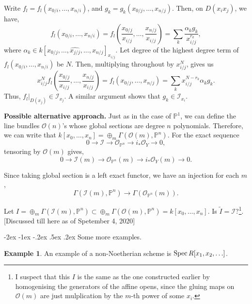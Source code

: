\documentclass[11pt]{amsart}
\makeatletter
\renewcommand\subsection{\@startsection {subsection}{1}{\z@}%
	{-2ex \@plus -1ex \@minus -.2ex}%
	{.5ex \@plus.2ex}%
	{\normalfont\bfseries}}
\newcommand{\Spec}{{\rm Spec \,}}
\renewcommand{\tilde}{\widetilde}
\newcommand{\sI}{{\mathcal I}}
\newcommand{\sO}{{\mathcal O}}
\renewcommand{\P}{{\mathbb P}}
\theoremstyle{definition}
\newtheorem{example}[theorem]{Example}
\makeatother
\begin{document}
Write $f_l=f_l(x_{0/i},\ldots,x_{n/i})$, and $g_k=g_k(x_{0/j},\ldots,x_{n/j})$. Then, on $D(x_i x_j)$, we have,
\[ f_l(x_{0/i},\ldots,x_{n/i})= f_l(\frac{x_{0/j}}{x_{i/j}}, \ldots,\frac{x_{n/j}}{x_{i/j}})=\sum_k \frac{\alpha_k g_k}{x_{i/j}^{r_k}}, \]
where $\alpha_k\in k[x_{0/j},\ldots,\widehat{x_{j/j}},\ldots,x_{n/j}]_{x_{i/j}}$. Let degree of the highest degree term of $f_l(x_{0/i},\ldots,x_{n/i})$ be $N$. Then, multiplying throughout by $x_{i/j}^N$, gives us
\[x_{i/j}^N f_l(\frac{x_{0/j}}{x_{i/j}},\ldots,\frac{x_{n/j}}{x_{i/j}})= f_l(x_{0/j},\ldots,x_{n/j})=\sum_k  x_{i/j}^{N-r_k} \alpha_k g_k.\]
Thus, $f_l|_{D(x_j)}\in \sI_{x_j}$. A similar argument shows that $g_k\in \sI_{x_i}$.

\noindent\textbf{Possible alternative approach.} Just as in the case of $\P^1$, we can define the line bundles $\sO(n)$'s whose global sections are degree $n$ polynomials. Therefore, we can write that $k[x_0,\ldots,x_n]=\oplus_m\Gamma (\sO(m),\P^n)$. For the exact sequence
\[0\rightarrow \sI\rightarrow \sO_{\P^n}\rightarrow i_*\sO_Y\rightarrow 0,\]
tensoring by $\sO(m)$ gives,
\[0\rightarrow \sI(m)\rightarrow \sO_{\P^n}(m)\rightarrow i_*\sO_Y(m)\rightarrow 0.\]

Since taking global section is a left exact functor, we have an injection for each $m$,
\[\Gamma (\sI(m),\P^n)\rightarrow \Gamma (\sO_{\P^n}(m)).\]

Let $I=\oplus_m \Gamma (\sI(m),\P^n)\subset \oplus_m\Gamma (\sO(m),\P^n) = k[x_0,\ldots,x_n]$. Is $\tilde{I}=\sI$?\footnote{I suspect that this $I$ is the same as the one constructed earlier by homogenising the generators of the affine opens, since the gluing maps on $\sO(m)$ are just mulplication by the $m$-th power of some $x_i$.}. [Discussed till here as of Spetember 4, 2020]

\subsection{Some more examples.}

\begin{example}
An example of a non-Noetherian scheme is $\Spec R[x_1,x_2,\ldots]$. 
\end{example}
\end{document}
